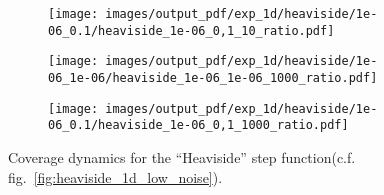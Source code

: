 \documentclass[a4paper,14pt]{extarticle}
\begin{document}
\begin{figure}
\begin{subfigure}[b]{0.25\linewidth}
    \caption{} \label{fig:heaviside_1d_low_noise_arb_c1}
  \end{subfigure}%
  \begin{subfigure}[b]{0.25\linewidth}
    \texttt{[image: images/output\_pdf/exp\_1d/heaviside/1e-06\_0.1/heaviside\_1e-06\_0,1\_10\_ratio.pdf]}
    \caption{} \label{fig:heaviside_1d_low_noise_arb_c2}
  \end{subfigure}%
  \begin{subfigure}[b]{0.25\linewidth}
    \texttt{[image: images/output\_pdf/exp\_1d/heaviside/1e-06\_1e-06/heaviside\_1e-06\_1e-06\_1000\_ratio.pdf]}
    \caption{} \label{fig:heaviside_1d_low_noise_arb_c3}
  \end{subfigure}%
  \begin{subfigure}[b]{0.25\linewidth}
    \texttt{[image: images/output\_pdf/exp\_1d/heaviside/1e-06\_0.1/heaviside\_1e-06\_0,1\_1000\_ratio.pdf]}
    \caption{} \label{fig:heaviside_1d_low_noise_arb_c4}
  \end{subfigure}%
  \caption{Coverage dynamics for the ``Heaviside'' step function(c.f. fig.~\ref{fig:heaviside_1d_low_noise}).}
  \label{fig:heaviside_1d_low_noise_arb}
\end{figure}
\end{document}
